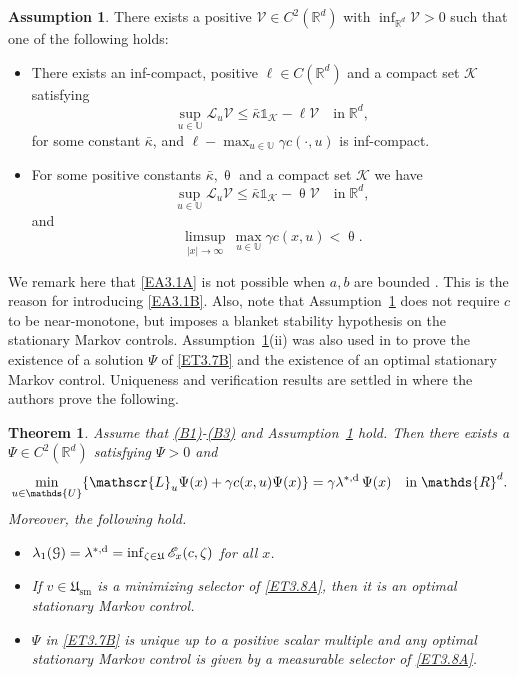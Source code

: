 \documentclass[notitlepage,11pt,reqno]{amsart}
\numberwithin{equation}{section}
\theoremstyle{plain}
\newtheorem{theorem}{Theorem}[section]
\theoremstyle{definition}
\newtheorem{assumption}{Assumption}[section]
\theoremstyle{remark}
\newcommand{\Ind}{\mathds{1}}       %
\newcommand{\Act}{{\mathds{U}}}
\newcommand{\sE}{{\mathscr{E}}}     %
\newcommand{\cG}{{\mathcal{G}}}     %
\newcommand{\cK}{{\mathcal{K}}}
\newcommand{\sL}{{\mathscr{L}}}
\newcommand{\Lyap}{{\mathscr{V}}}   %
\newcommand{\Uadm}{\mathfrak{U}}
\newcommand{\Usm}{\mathfrak{U}_{\mathrm{sm}}}
\newcommand{\lamstrdf}{\lambda^{*,{\rm d}}}
\newcommand{\Rd}{{\mathds{R}^{d}}}
\begin{document}
\begin{assumption}\label{A3.1}
There exists a positive $\Lyap\in C^2(\Rd)$ with $\inf_{\Rd}\Lyap>0$
such that one of the following holds:
\begin{itemize}
\item[(i)] There exists an inf-compact, positive $\ell\in C(\Rd)$ and
a compact set $\cK$ satisfying
\begin{equation}\label{EA3.1A}
\sup_{u\in\Act}\sL_u \Lyap \leq \bar\kappa \Ind_\cK -\ell \Lyap
\quad \text{in}\; \Rd,
\end{equation}
for some constant $\bar\kappa$, and 
$\ell-\max_{u\in\Act} \gamma c(\cdot, u)$
is inf-compact.
\item[(ii)] For some positive constants $\bar\kappa, \uptheta$
and a compact set $\cK$
we have
\begin{equation}\label{EA3.1B}
\sup_{u\in\Act}\sL_u \Lyap \leq \bar\kappa \Ind_\cK -\uptheta \Lyap
\quad \text{in}\; \Rd,
\end{equation}
and
$$\limsup_{|x|\to\infty}\, \max_{u\in\Act}\gamma c(x, u)<\uptheta.$$
\end{itemize}
\end{assumption}
We remark here that \eqref{EA3.1A} is not possible 
when $a, b$ are bounded \cite[Proposition~2.6]{MR3340379}. This is the reason for introducing \eqref{EA3.1B}. Also, note that Assumption~\ref{A3.1} does not require $c$ to be near-monotone, but imposes
a blanket stability hypothesis on the stationary Markov controls.
Assumption~\ref{A3.1}(ii) was also used in \cite{MR2796095} to
prove the existence of a solution $\Psi$ of \eqref{ET3.7B} and the existence of an optimal stationary Markov control.
Uniqueness and verification results are settled in \cite{MR3926044}
where the authors prove the following.
\begin{theorem}\label{T3.8}
Assume that \hyperlink{B1}{(B1)}-\hyperlink{B3}{(B3)} and 
Assumption~\ref{A3.1} hold. Then there exists a
$\Psi\in C^2(\Rd)$ satisfying $\Psi>0$ and
\begin{equation}\label{ET3.8A}
\min_{u\in\Act}\{\sL_u\Psi(x) + \gamma c(x, u)\Psi(x)\}=\gamma\lamstrdf\,\Psi(x)\quad \text{in}\; \Rd.
\end{equation}
Moreover, the following hold.
\begin{itemize}
\item[(i)] $\lambda_1(\cG)=\lamstrdf=\inf_{\zeta\in\Uadm} \sE_x(c, \zeta)$ for all $x$.
\item[(ii)] If $v\in\Usm$ is a minimizing selector of \eqref{ET3.8A},
then it is an optimal stationary Markov control.
\item[(iii)]$\Psi$ in \eqref{ET3.7B} is unique up to a positive scalar multiple and any optimal stationary Markov control is given by a measurable selector
of \eqref{ET3.8A}.
\end{itemize}
\end{theorem}
\end{document}

